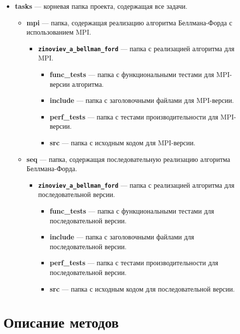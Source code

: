 \documentclass[12pt]{article}
\begin{document}
\begin{itemize}
    \item \textbf{tasks} — корневая папка проекта, содержащая все задачи.
    \begin{itemize}
        \item \textbf{mpi} — папка, содержащая реализацию алгоритма Беллмана-Форда с использованием MPI.
        \begin{itemize}
            \item \textbf{\texttt{zinoviev\_a\_bellman\_ford}} — папка с реализацией алгоритма для MPI.
            \begin{itemize}
                \item \textbf{func\_tests} — папка с функциональными тестами для MPI-версии алгоритма.
                \item \textbf{include} — папка с заголовочными файлами для MPI-версии.
                \item \textbf{perf\_tests} — папка с тестами производительности для MPI-версии.
                \item \textbf{src} — папка с исходным кодом для MPI-версии.
            \end{itemize}
        \end{itemize}
        \item \textbf{seq} — папка, содержащая последовательную реализацию алгоритма Беллмана-Форда.
        \begin{itemize}
            \item \textbf{\texttt{zinoviev\_a\_bellman\_ford}} — папка с реализацией алгоритма для последовательной версии.
            \begin{itemize}
                \item \textbf{func\_tests} — папка с функциональными тестами для последовательной версии.
                \item \textbf{include} — папка с заголовочными файлами для последовательной версии.
                \item \textbf{perf\_tests} — папка с тестами производительности для последовательной версии.
                \item \textbf{src} — папка с исходным кодом для последовательной версии.
            \end{itemize}
        \end{itemize}
    \end{itemize}
\end{itemize}

\section*{Описание методов}
\end{document}
